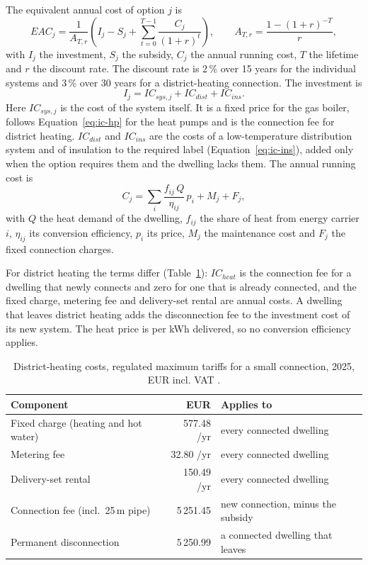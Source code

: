 \documentclass[preprint,12pt,authoryear]{elsarticle}
\begin{document}
The equivalent annual cost of option $j$ is
\begin{equation}\label{eq:eac}
  EAC_j = \frac{1}{A_{T,r}}\left(I_j - S_j
  + \sum_{t=0}^{T-1}\frac{C_j}{(1+r)^{t}}\right),
  \qquad A_{T,r} = \frac{1-(1+r)^{-T}}{r},
\end{equation}
with $I_j$ the investment, $S_j$ the subsidy, $C_j$ the annual running
cost, $T$ the lifetime and $r$ the discount rate. The discount rate is
2\,\% over 15 years for the individual systems and 3\,\% over 30 years for
a district-heating connection. The investment is
\begin{equation}\label{eq:ic-total}
  I_j = IC_{sys,j} + IC_{dist} + IC_{ins}.
\end{equation}
Here $IC_{sys,j}$ is the cost of the system itself. It is a fixed price
for the gas boiler, follows Equation~\ref{eq:ic-hp} for the heat pumps and
is the connection fee for district heating. $IC_{dist}$ and $IC_{ins}$ are
the costs of a low-temperature distribution system and of insulation to
the required label (Equation~\ref{eq:ic-ins}), added only when the option
requires them and the dwelling lacks them. The annual running cost is
\begin{equation}\label{eq:c-annual}
  C_j = \sum_{i}\frac{f_{ij}\,Q}{\eta_{ij}}\,p_i + M_j + F_j,
\end{equation}
with $Q$ the heat demand of the dwelling, $f_{ij}$ the share of heat from
energy carrier $i$, $\eta_{ij}$ its conversion efficiency, $p_i$ its price,
$M_j$ the maintenance cost and $F_j$ the fixed connection charges.

For district heating the terms differ (Table~\ref{tab:dh-costs}): $IC_{heat}$
is the connection fee for a dwelling that newly connects and zero for one
that is already connected, and the fixed charge, metering fee and
delivery-set rental are annual costs. A dwelling that leaves district heating
adds the disconnection fee to the investment cost of its new system. The heat
price is per kWh delivered, so no conversion efficiency applies.

\begin{table}[htbp]
  \centering
  \caption{District-heating costs, regulated maximum tariffs for a small
  connection, 2025, EUR incl. VAT \citep{marktTarievenWarmteKoude}.}
  \label{tab:dh-costs}
  \begin{tabular}{lrl}
    \toprule
    Component & EUR & Applies to \\
    \midrule
    Fixed charge (heating and hot water) & 577.48 /yr & every connected
    dwelling \\
    Metering fee & 32.80 /yr & every connected dwelling \\
    Delivery-set rental & 150.49 /yr & every connected dwelling \\
    Connection fee (incl.\ 25\,m pipe) & 5\,251.45 & new connection, minus
    the subsidy \\
    Permanent disconnection & 5\,250.99 & a connected dwelling that leaves \\
    \bottomrule
  \end{tabular}
\end{table}
\end{document}
